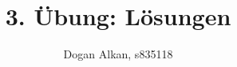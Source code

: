 \documentclass[a4paper,%
twoside,							%
headsepline = true,				%
footsepline = true,				%
headings=normal,
listof = totoc,					%
bibliography = totoc,		%
listof = entryprefix,		%
]
{scrartcl}
\begin{document}
\renewcommand*{\thesection}{\arabic{section}}
\renewcommand*{\thesubsection}{\alph{subsection}}
\renewcommand*{\thesubsubsection}{\arabic{subsubsection}}





\subject{\noindent\hrulefill\\ Multimediale Informationsverarbeitung}
\title{3. Übung: Lösungen}
\author{Dogan Alkan, s835118}
\date{\noindent\hrulefill}	\noindent						%
\maketitle 						%


\tableofcontents			%

\end{document}
